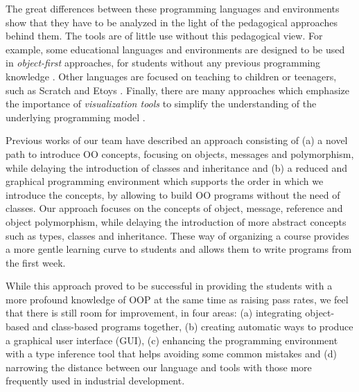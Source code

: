 The great differences between these programming languages and environments show that they have to be analyzed in the light of the pedagogical approaches behind them.
The tools are of little use without this pedagogical view.
For example, some educational languages and environments are designed to be used in \textit{object-first} approaches, 
\ie for students without any previous programming knowledge \cite{arnow_introduction_1998, bruce_library_2001}.
Other languages are focused on teaching to children or teenagers, such as Scratch \cite{malan_scratch_2007} and Etoys \cite{lee_empowering_2011}. 
Finally, there are many approaches which emphasize the importance of \emph{visualization tools} 
to simplify the understanding of the underlying programming model \cite{cooper_teaching_2003, roberts_designing_1998}.

\medskip

Previous works of our team \cite{lombardi_instances_2007,lombardi_carlos_alumnos_2008,griggio_programming_2011,spigariol_lucas_ensenando_2013} have described an approach consisting of
(a) a novel path to introduce OO concepts, focusing on objects, messages and polymorphism, while delaying the introduction of classes and inheritance and 
(b) a reduced and graphical programming environment which supports the order in which we introduce the concepts, by allowing to build OO programs without the need of classes.
Our approach focuses on the concepts of object, message, reference and object polymorphism, while delaying the introduction of more abstract concepts such as types, classes and inheritance.
These way of organizing a course provides a more gentle learning curve to students and allows them to write programs from the first week.

While this approach proved to be successful in providing the students with a more profound knowledge of OOP at the same time as raising pass rates, 
we feel that there is still room for improvement, in four areas:
(a) integrating object-based and class-based programs together,
(b) creating automatic ways to produce a graphical user interface (GUI),
(c) enhancing the programming environment with a type inference tool that helps avoiding some common mistakes
and (d) narrowing the distance between our language and tools with those more frequently used in industrial development.

